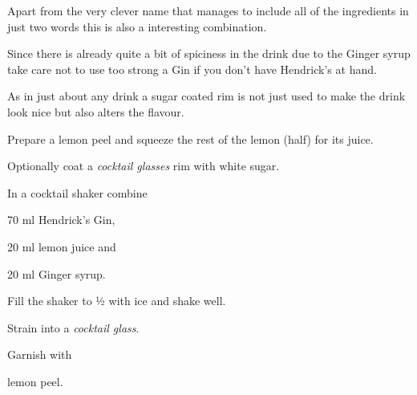 \startsection[title={Lemon Gingerini},reference=lemongingerini]
Apart from the very clever name that manages to include all of the
ingredients in just two words this is also a interesting combination.

Since there is already quite a bit of spiciness in the drink due to the
Ginger syrup take care not to use too strong a Gin if you don't have
Hendrick's at hand.

As in just about any drink a sugar coated rim is not just used to make
the drink look nice but also alters the flavour.

\startitemize
\item Prepare a lemon peel and squeeze the rest of the lemon (half) for
      its juice.
\item Optionally coat a {\em cocktail glasses} rim with white sugar.
\item In a cocktail shaker combine
      \startitemize
      \item 70 ml Hendrick's Gin,
      \item 20 ml lemon juice and
      \item 20 ml Ginger syrup.
      \stopitemize
\item Fill the shaker to ½ with ice and shake well.
\item Strain into a {\em cocktail glass}.
\item Garnish with
      \startitemize
      \item lemon peel.
      \stopitemize
\stopitemize
